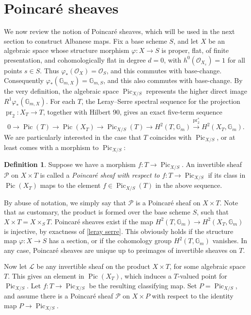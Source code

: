 \documentclass[oneside, 12pt]{amsart}
\newcommand\mylabel[1]{\label{#1}\marginpar{\raggedright\vspace{-1ex}\medskip\medskip\footnotesize \tt #1}}
\renewcommand\mylabel[1]{\label{#1}}
\theoremstyle{definition}
\newtheorem{definition}[theorem]{Definition}
\theoremstyle{remark}
\newcommand{\GG}{\mathbb{G}}
\newcommand{\shL}{\mathscr{L}}
\newcommand{\shP}{\mathscr{P}}
\newcommand{\lra}{\longrightarrow}
\renewcommand{\O}{\mathscr{O}}
\newcommand{\Pic}{\operatorname{Pic}}
\newcommand{\pr}{\operatorname{pr}}
\newcommand{\ra}{\rightarrow}
\begin{document}
\section{Poincar\'e sheaves}
\mylabel{Poincare}

We now review the notion of Poincar\'e sheaves, which will be used in the next section to construct Albanese maps.
Fix a base scheme $S$, and let $X$ be an algebraic space whose structure morphism $\varphi:X\ra S$
is proper, flat, of finite presentation, and cohomologically flat in degree $d=0$, with $h^0(\O_{X_s})=1$ 
for all points $s\in S$.
 Thus $\varphi_*(\O_X)=\O_S$, and this commutes with base-change.
Consequently   $\varphi_*(\GG_{m,X})=\GG_{m,S}$, and this also commutes with base-change.
By the very definition, the algebraic space  $\Pic_{X/S}$ represents the higher direct image   $R^1\varphi_*(\GG_{m,X})$.
For each $T$, the  Leray--Serre spectral sequence for the projection $\pr_2:X_T\ra T$, together with Hilbert 90,  gives an exact five-term sequence
\begin{equation}
\label{leray serre}
0\lra \Pic(T)\lra \Pic(X_T)\lra \Pic_{X/S}(T)\lra H^2(T,\GG_m) \stackrel{\pr_2^*}{\lra} H^2(X_T,\GG_m).
\end{equation}
We are particularly interested in the case  that $T$ coincides with $\Pic_{X/S}$, or at least comes
with a morphism to $\Pic_{X/S}$:

\begin{definition}
\mylabel{poincare sheaf}
Suppose we have a morphism $f:T\ra\Pic_{X/S}$.
An invertible sheaf $\shP$ on $X\times T$ is called a \emph{Poincar\'e sheaf  with respect to $f:T\ra\Pic_{X/S}$}
if its   class in $\Pic(X_T)$ maps to the element $f\in \Pic_{X/S}(T)$  in the above sequence.
\end{definition}

By abuse of notation, we  simply   say that $\shP$ is a Poincar\'e sheaf  on $X\times T$.
Note that as customary, the product is formed over the base scheme $S$, such that $X\times T=X\times_ST$.
Poincar\'e sheaves exist  if the map $H^2(T,\GG_m) \ra H^2(X_T,\GG_m)$ 
is injective, by exactness of \eqref{leray serre}. This obviously holds  if the structure map $\varphi:X\ra S$ has a section,
or if the cohomology group $H^2(T,\GG_m)$ vanishes.
In any case, Poincar\'e sheaves are unique up to preimages of  invertible sheaves   on $T$.

Now let $\shL$ be any invertible sheaf on the product $X\times T$, for some algebraic space $T$.
This gives an element in $\Pic(X_T)$, which induces a $T$-valued point for   $\Pic_{X/S}$.
Let $f:T\ra\Pic_{X/S}$ be the resulting classifying map. Set $P=\Pic_{X/S}$, and assume there is a   Poincar\'e sheaf $\shP$  on $X\times P$
with respect to the identity map $P\ra\Pic_{X/S}$.
\end{document}
